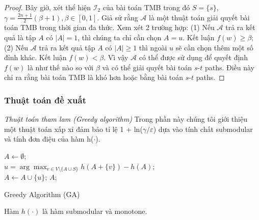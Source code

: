 \begin{proof}
	Bây giờ, xét thể hiện $\mathcal{I}_2$ của bài toán TMB trong đó $S=\{s\}$, $\gamma = \frac{2n+1}{2}(\beta+ 1) , \beta \in [0, 1]$.  Giả sử rằng $\mathcal{A}$ là một thuật toán giải quyết bài toán TMB trong thời gian đa thức. Xem xét 2 trường hợp: (1) Nếu $\mathcal{A}$ trả ra kết quả là tập $A$ có $|A|=1$, thì chúng ta chỉ cần chọn $A={u}$. Kết luận $f(w) \geq \beta$; (2) Nếu $\mathcal{A}$ trả ra kết quả tập $A$ có $|A| \ge 1$ thì ngoài $u$ sẽ cần chọn thêm một số đỉnh khác. Kết luận $f(w) < \beta$. Vì vậy $\mathcal{A}$ có thể được sử dụng để quyết định $f(w)$ là như thế nào so với $\beta$ và có thể giải quyết bài toán $s$-$t$ paths. Điều này chỉ ra rằng bài toán TMB là khó hơn hoặc bằng bài toán $s$-$t$ paths.
\end{proof}
\subsubsection{Thuật toán đề xuất}
{\itshape Thuật toán tham lam (Greedy algorithm)}
Trong phần này chúng tôi giới thiệu một thuật toán xấp xỉ đảm bảo tỉ lệ 1 + ln($\gamma / \varepsilon$) dựa vào tính chất submodular và tính đơn điệu của hàm h($\cdot$). 		
\begin{algorithm}[hpt]			
	$A \leftarrow \emptyset$;
	\\
	{ 	
		$u=\arg \max_{v \in V\setminus \{A \cup S\}} {h(A+ \{v\})- h(A)}$; 
		\\
		$A \leftarrow A \cup \{u\}$;
	}
	\Return $A$;
	\caption{Greedy Algorithm (GA)}
	\label{GA}
\end{algorithm}

\begin{theo}					
	Hàm $h(\cdot)$ là hàm submodular và monotone. 
	\label{sub}
\end{theo}	

